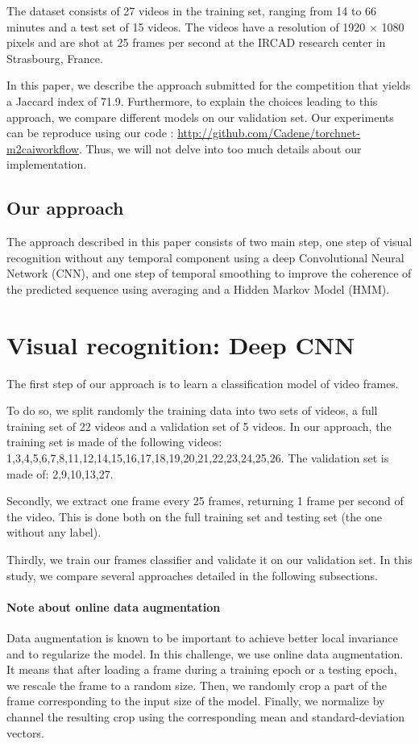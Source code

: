 \documentclass[10pt,twocolumn,letterpaper]{article}
\begin{document}
The dataset \cite{Stauder2016} consists of 27 videos in the training set, ranging from 14 to 66
minutes and a test set of 15 videos. The videos have a resolution of 1920 $\times$
1080 pixels and are shot at 25 frames per second at the IRCAD research center in
Strasbourg, France.

In this paper, we describe the approach submitted for the competition that yields a Jaccard index of 71.9. Furthermore, to explain the choices leading to this approach, we compare different models on our validation set. Our experiments can be reproduce using our code : \url{http://github.com/Cadene/torchnet-m2caiworkflow}. Thus, we will not delve into too much details about our implementation.

\subsection{Our approach}

The approach described in this paper consists of two main step, one step of visual recognition without any temporal component using a deep Convolutional Neural Network (CNN), and one step of temporal smoothing to improve the coherence of the predicted sequence using averaging and a Hidden Markov Model (HMM).

\section{Visual recognition: Deep CNN}

The first step of our approach is to learn a classification model of video frames.

To do so, we split randomly the training data into two sets of videos, a full training set of 22 videos and a validation set of 5 videos. In our approach, the training set is made of the following videos: 1,3,4,5,6,7,8,11,12,14,15,16,17,18,19,20,21,22,23,24,25,26. The validation set is made of: 2,9,10,13,27.

Secondly, we extract one frame every 25 frames, returning 1 frame per second of the video. This is done both on the full training set and testing set (the one without any label).

Thirdly, we train our frames classifier and validate it on our validation set. In this study, we compare several approaches detailed in the following subsections.

\paragraph{Note about online data augmentation}
Data augmentation is known to be important to achieve better local invariance and to regularize the model.
In this challenge, we use online data augmentation. It means that after loading a frame during a training epoch or a testing epoch, we rescale the frame to a random size. Then, we randomly crop a part of the frame corresponding to the input size of the model. Finally, we normalize by channel the resulting crop using the corresponding mean and standard-deviation vectors. 
\end{document}
